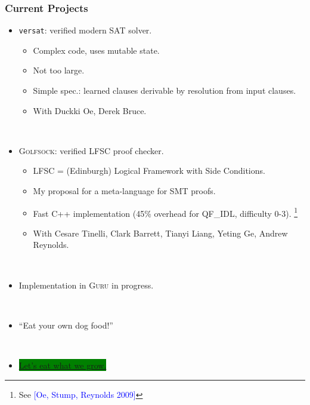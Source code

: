 \documentclass[10pt]{beamer}
\begin{document}
\begin{frame}
\frametitle{Current Projects}

\begin{itemize}
\item \texttt{versat}: verified modern SAT solver.
\begin{itemize}
\item Complex code, uses mutable state.
\item Not too large.
\item Simple spec.: learned clauses derivable by resolution from input clauses.
\item With Duckki Oe, Derek Bruce.
\end{itemize}

\ 

\item \textsc{Golfsock}: verified LFSC proof checker.
\begin{itemize}
\item LFSC = (Edinburgh) Logical Framework with Side Conditions.
\item My proposal for a meta-language for SMT proofs.
\item Fast C++ implementation (45\% overhead for QF\_IDL, difficulty 0-3). \footnote{See \textcolor{blue}{[Oe, Stump, Reynolds 2009]}}
\item With Cesare Tinelli, Clark Barrett, Tianyi Liang, Yeting Ge, Andrew Reynolds.
\end{itemize}

\ 

\item Implementation in \textsc{Guru} in progress.

\pause

\  

\item ``Eat your own dog food!''

\pause

\ 

\item \colorbox{green}{\underline{Let's eat what we grow.}}

\end{itemize}
\end{frame}
\end{document}
